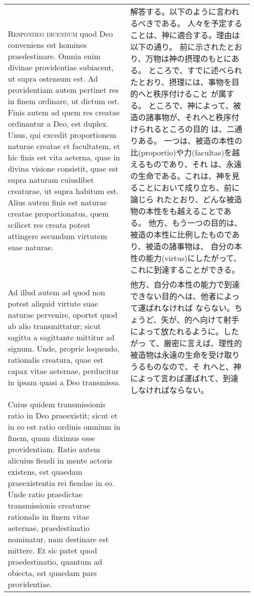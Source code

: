 \documentclass[10pt]{jsarticle} %
\begin{document}
\begin{longtable}{p{21em}p{21em}}
\\


{\scshape Respondeo dicendum} quod Deo conveniens est
homines praedestinare. Omnia enim divinae providentiae subiacent, ut
supra ostensum est. Ad providentiam autem pertinet res in finem
ordinare, ut dictum est. Finis autem ad quem res creatae ordinantur a
Deo, est duplex. Unus, qui excedit proportionem naturae creatae et
facultatem, et hic finis est vita aeterna, quae in divina visione
consistit, quae est supra naturam cuiuslibet creaturae, ut supra habitum
est. Alius autem finis est naturae creatae proportionatus, quem scilicet
res creata potest attingere secundum virtutem suae naturae. 

 
&

解答する。以下のように言われるべきである。
人々を予定することは、神に適合する。理由は以下の通り。
前に示されたとおり、万物は神の摂理のもとにある。
ところで、すでに述べられたとおり、摂理には、事物を目的へと秩序付けること
 が属する。
ところで、神によって、被造の諸事物が、それへと秩序付けられるところの目的
 は、二通りある。
一つは、被造の本性の比(proportio)や力(facultas)を越えるものであり、それ
 は、永遠の生命である。これは、神を見ることにおいて成り立ち、前に論じら
 れたとおり、どんな被造物の本性をも越えることである。
他方、もう一つの目的は、被造の本性に比例したものであり、被造の諸事物は、
 自分の本性の能力(virtus)にしたがって、これに到達することができる。




\\


Ad illud
autem ad quod non potest aliquid virtute suae naturae pervenire, oportet
quod ab alio transmittatur; sicut sagitta a sagittante mittitur ad
signum. Unde, proprie loquendo, rationalis creatura, quae est capax
vitae aeternae, perducitur in ipsam quasi a Deo transmissa. 

 
&

他方、自分の本性の能力で到達できない目的へは、他者によって運ばれなければ
 ならない。ちょうど、矢が、的へ向けて射手によって放たれるように。したがっ
 て、厳密に言えば、理性的被造物は永遠の生命を受け取りうるものなので、そ
 れへと、神によって言わば運ばれて、到達しなければならない。


\\


Cuius quidem
transmissionis ratio in Deo praeexistit; sicut et in eo est ratio
ordinis omnium in finem, quam diximus esse providentiam. Ratio autem
alicuius fiendi in mente actoris existens, est quaedam praeexistentia
rei fiendae in eo. Unde ratio praedictae transmissionis creaturae
rationalis in finem vitae aeternae, praedestinatio nominatur, nam
destinare est mittere. Et sic patet quod praedestinatio, quantum ad
obiecta, est quaedam pars providentiae.



\end{longtable}
\end{document}
